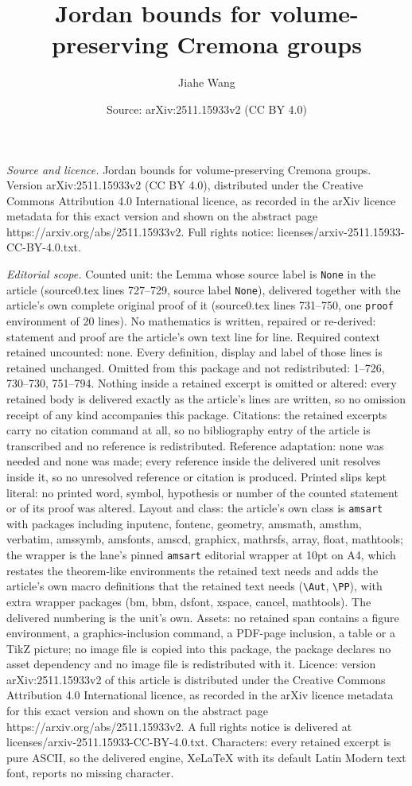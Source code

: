 \documentclass[10pt,a4paper]{amsart}
\title[Jordan bounds for volume-preserving Cremona groups]{Jordan bounds for volume-preserving Cremona groups}
\author{Jiahe Wang}
\date{Source: arXiv:2511.15933v2 (CC BY 4.0)}
\begin{document}
\maketitle

\noindent\emph{Source and licence.} Jordan bounds for volume-preserving Cremona groups. Version arXiv:2511.15933v2 (CC BY 4.0), distributed under the Creative Commons Attribution 4.0 International licence, as recorded in the arXiv licence metadata for this exact version and shown on the abstract page https://arxiv.org/abs/2511.15933v2. Full rights notice: licenses/arxiv-2511.15933-CC-BY-4.0.txt.\par\smallskip

\noindent\textit{Editorial scope.} Counted unit: the Lemma whose source label is \texttt{None} in the article (source0.tex lines 727--729, source label \texttt{None}), delivered together with the article's own complete original proof of it (source0.tex lines 731--750, one \texttt{proof} environment of 20 lines). No mathematics is written, repaired or re-derived: statement and proof are the article's own text line for line. Required context retained uncounted: none. Every definition, display and label of those lines is retained unchanged. Omitted from this package and not redistributed: 1--726, 730--730, 751--794. Nothing inside a retained excerpt is omitted or altered: every retained body is delivered exactly as the article's lines are written, so no omission receipt of any kind accompanies this package. Citations: the retained excerpts carry no citation command at all, so no bibliography entry of the article is transcribed and no reference is redistributed. Reference adaptation: none was needed and none was made; every reference inside the delivered unit resolves inside it, so no unresolved reference or citation is produced. Printed slips kept literal: no printed word, symbol, hypothesis or number of the counted statement or of its proof was altered. Layout and class: the article's own class is \texttt{amsart} with packages including inputenc, fontenc, geometry, amsmath, amsthm, verbatim, amssymb, amsfonts, amscd, graphicx, mathrsfs, array, float, mathtools; the wrapper is the lane's pinned \texttt{amsart} editorial wrapper at 10pt on A4, which restates the theorem-like environments the retained text needs and adds the article's own macro definitions that the retained text needs (\texttt{\textbackslash Aut}, \texttt{\textbackslash PP}), with extra wrapper packages (bm, bbm, dsfont, xspace, cancel, mathtools). The delivered numbering is the unit's own. Assets: no retained span contains a figure environment, a graphics-inclusion command, a PDF-page inclusion, a table or a TikZ picture; no image file is copied into this package, the package declares no asset dependency and no image file is redistributed with it. Licence: version arXiv:2511.15933v2 of this article is distributed under the Creative Commons Attribution 4.0 International licence, as recorded in the arXiv licence metadata for this exact version and shown on the abstract page https://arxiv.org/abs/2511.15933v2. A full rights notice is delivered at licenses/arxiv-2511.15933-CC-BY-4.0.txt. Characters: every retained excerpt is pure ASCII, so the delivered engine, XeLaTeX with its default Latin Modern text font, reports no missing character.
\end{document}
